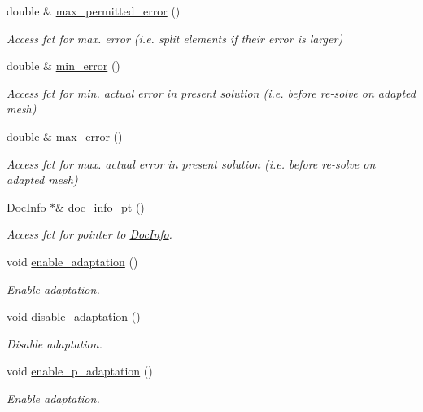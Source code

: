 \begin{DoxyCompactItemize}
double \& \hyperlink{classoomph_1_1RefineableMeshBase_adb5ba9ac30bf0a0683eb30f5703800e4}{max\+\_\+permitted\+\_\+error} ()
\begin{DoxyCompactList}\small\item\em Access fct for max. error (i.\+e. split elements if their error is larger) \end{DoxyCompactList}\item 
double \& \hyperlink{classoomph_1_1RefineableMeshBase_a60baf0add6d015ca4248622ce21ae09f}{min\+\_\+error} ()
\begin{DoxyCompactList}\small\item\em Access fct for min. actual error in present solution (i.\+e. before re-\/solve on adapted mesh) \end{DoxyCompactList}\item 
double \& \hyperlink{classoomph_1_1RefineableMeshBase_a8d7689918a098ce597c3d4fc716a0727}{max\+\_\+error} ()
\begin{DoxyCompactList}\small\item\em Access fct for max. actual error in present solution (i.\+e. before re-\/solve on adapted mesh) \end{DoxyCompactList}\item 
\hyperlink{classoomph_1_1DocInfo}{Doc\+Info} $\ast$\& \hyperlink{classoomph_1_1RefineableMeshBase_a706216900b53bc7d9214e1f982e69309}{doc\+\_\+info\+\_\+pt} ()
\begin{DoxyCompactList}\small\item\em Access fct for pointer to \hyperlink{classoomph_1_1DocInfo}{Doc\+Info}. \end{DoxyCompactList}\item 
void \hyperlink{classoomph_1_1RefineableMeshBase_a369a915c290a07f1b43efabc5af272f2}{enable\+\_\+adaptation} ()
\begin{DoxyCompactList}\small\item\em Enable adaptation. \end{DoxyCompactList}\item 
void \hyperlink{classoomph_1_1RefineableMeshBase_a7bdb132c6562c922ddbc1e152b6e9d73}{disable\+\_\+adaptation} ()
\begin{DoxyCompactList}\small\item\em Disable adaptation. \end{DoxyCompactList}\item 
void \hyperlink{classoomph_1_1RefineableMeshBase_a1c0bd748288c580dfaee4f865ac6dd36}{enable\+\_\+p\+\_\+adaptation} ()
\begin{DoxyCompactList}\small\item\em Enable adaptation. \end{DoxyCompactList}\item 

\end{DoxyCompactItemize}
